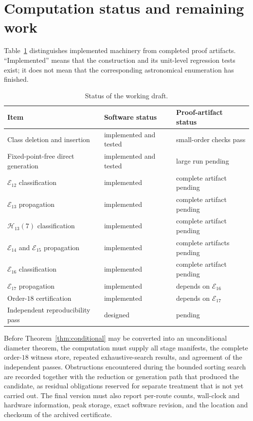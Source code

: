 \documentclass[11pt]{article}
\theoremstyle{definition}
\theoremstyle{remark}
\newcommand{\En}{\mathcal E}
\newcommand{\Hn}{\mathcal H}
\begin{document}
\section{Computation status and remaining work}\label{sec:status}

Table~\ref{tab:status} distinguishes implemented machinery from completed
proof artifacts.  ``Implemented'' means that the construction and its
unit-level regression tests exist; it does not mean that the corresponding
astronomical enumeration has finished.

\begin{table}[ht]
\centering
\begin{tabular}{@{}lll@{}}
\toprule
Item & Software status & Proof-artifact status \\
\midrule
Class deletion and insertion & implemented and tested & small-order checks pass \\
Fixed-point-free direct generation & implemented and tested & large run pending \\
$\En_{12}$ classification & implemented & complete artifact pending \\
$\En_{13}$ propagation & implemented & complete artifact pending \\
$\Hn_{13}(7)$ classification & implemented & complete artifact pending \\
$\En_{14}$ and $\En_{15}$ propagation
  & implemented & complete artifacts pending \\
$\En_{16}$ classification & implemented & complete artifact pending \\
$\En_{17}$ propagation & implemented & depends on $\En_{16}$ \\
Order-$18$ certification & implemented & depends on $\En_{17}$ \\
Independent reproducibility pass & designed & pending \\
\bottomrule
\end{tabular}
\caption{Status of the working draft.}
\label{tab:status}
\end{table}

Before Theorem~\ref{thm:conditional} may be converted into an unconditional
diameter theorem, the computation must supply all stage manifests, the
complete order-$18$ witness store, repeated exhaustive-search results, and agreement of
the independent passes.  Obstructions encountered during the bounded sorting
search are recorded together with the reduction or generation path that
produced the candidate, as residual obligations reserved for separate treatment
that is not yet carried out.  The final version must also report per-route counts,
wall-clock and hardware information, peak storage, exact software revision,
and the location and checksum of the archived certificate.
\end{document}
